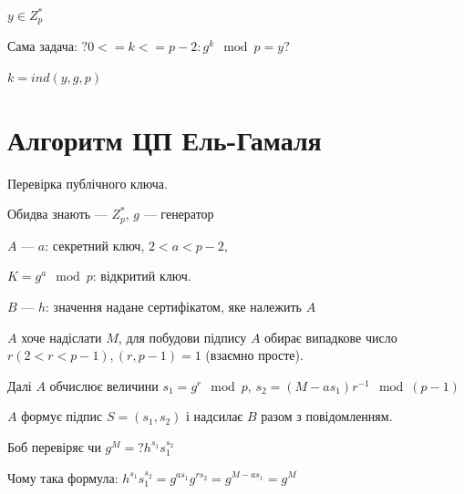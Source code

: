 \documentclass{article}
\begin{document}
        $y \in Z_p^*$

        Сама задача: $? 0 <= k <= p - 2: g^k \mod{p} = y?$

        $k = ind(y, g, p)$

    \section{Алгоритм ЦП Ель-Гамаля}
        Перевірка публічного ключа.

        Обидва знають --- $Z_p^*$, $g$ --- генератор
        
        $A$ --- $a$: секретний ключ, $ 2 < a < p-2 $,
        
        \quad \quad $K = g^a\mod{p}$: відкритий ключ.
        
        $B$ --- $h$: значення надане сертифікатом, яке належить $A$

        $A$ хоче надіслати $M$, для побудови підпису $A$ обирає випадкове число $ r (2 < r < p-1), (r, p-1) = 1$ (взаємно просте).

        Далі $A$ обчислює величини $ s_1 = g^r \mod{p}$, $s_2 = (M - a s_1) r^{-1} \mod{(p-1)} $

        $A$ формує підпис $ S = (s_1, s_2) $ і надсилає $ B $ разом з повідомленням.

        Боб перевіряє чи $ g^M =? h^{s_1} s_1^{s_2} $

        Чому така формула: $ h^{s_1} s_1^{s_2} = g^{a s_1} g^{r s_2} = g^{M - a s_1} = g^M $
\end{document}
